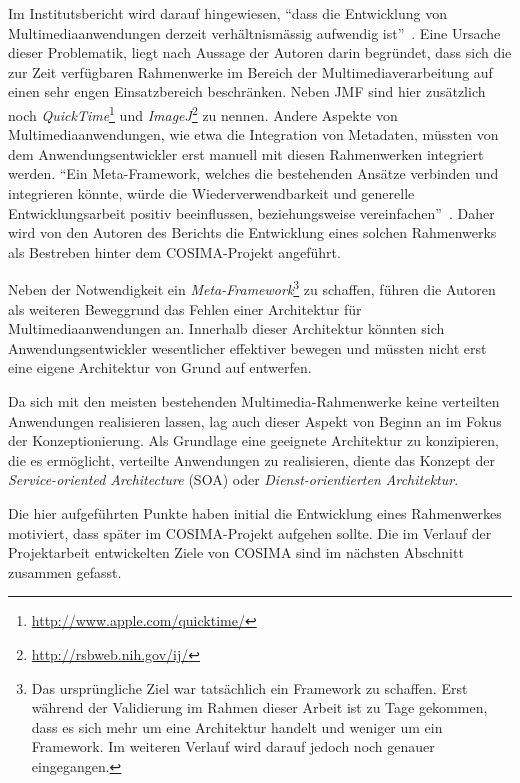   Im Institutsbericht wird darauf hingewiesen, "`dass die Entwicklung von Multimediaanwendungen derzeit verhältnismässig aufwendig ist"'~\citep[S. 2]{bericht}. Eine Ursache dieser Problematik, liegt nach Aussage der Autoren darin begründet, dass sich die zur Zeit verfügbaren Rahmenwerke im Bereich der Multimediaverarbeitung auf einen sehr engen Einsatzbereich beschränken. Neben JMF sind hier zusätzlich noch \emph{QuickTime}\footnote{\url{http://www.apple.com/quicktime/}} und \emph{ImageJ}\footnote{\url{http://rsbweb.nih.gov/ij/}} zu nennen. Andere Aspekte von Multimediaanwendungen, wie etwa die Integration von Metadaten, müssten von dem Anwendungsentwickler erst manuell mit diesen Rahmenwerken integriert werden. "`Ein Meta-Framework, welches die bestehenden Ansätze verbinden und integrieren könnte, würde die Wiederverwendbarkeit und generelle Entwicklungsarbeit positiv beeinflussen, beziehungsweise vereinfachen"'~\citep[S. 3]{bericht}. Daher wird von den Autoren des Berichts die Entwicklung eines solchen Rahmenwerks als Bestreben hinter dem COSIMA-Projekt angeführt.
  
  Neben der Notwendigkeit ein \emph{Meta-Framework}\footnote{Das ursprüngliche Ziel war tatsächlich ein Framework zu schaffen. Erst während der Validierung im Rahmen dieser Arbeit ist zu Tage gekommen, dass es sich mehr um eine Architektur handelt und weniger um ein Framework. Im weiteren Verlauf wird darauf jedoch noch genauer eingegangen.} zu schaffen, führen die Autoren als weiteren Beweggrund das Fehlen einer Architektur für Multimediaanwendungen an. Innerhalb dieser Architektur könnten sich Anwendungsentwickler wesentlicher effektiver bewegen und müssten nicht erst eine eigene Architektur von Grund auf entwerfen.
  
  Da sich mit den meisten bestehenden Multimedia-Rahmenwerke keine verteilten Anwendungen realisieren lassen, lag auch dieser Aspekt von Beginn an im Fokus der Konzeptionierung. Als Grundlage eine geeignete Architektur zu konzipieren, die es ermöglicht, verteilte Anwendungen zu realisieren, diente das Konzept der \emph{Service-oriented Architecture} (SOA) oder \emph{Dienst-orientierten Architektur}.
  
  Die hier aufgeführten Punkte haben initial die Entwicklung eines Rahmenwerkes motiviert, dass später im COSIMA-Projekt aufgehen sollte. Die im Verlauf der Projektarbeit entwickelten Ziele von COSIMA sind im nächsten Abschnitt zusammen gefasst.

  
